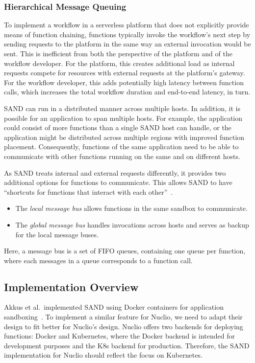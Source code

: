 \subsubsection{Hierarchical Message Queuing}

To implement a workflow in a serverless platform that does not explicitly provide means of function chaining, functions typically invoke the workflow's next step by sending requests to the platform in the same way an external invocation would be sent.
This is inefficient from both the perspective of the platform and of the workflow developer.
For the platform, this creates additional load as internal requests compete for resources with external requests at the platform's gateway.
For the workflow developer, this adds potentially high latency between function calls, which increases the total workflow duration and end-to-end latency, in turn.

SAND can run in a distributed manner across multiple hosts.
In addition, it is possible for an application to span multiple hosts.
For example, the application could consist of more functions than a single SAND host can handle, or the application might be distributed across multiple regions with improved function placement.
Consequently, functions of the same application need to be able to communicate with other functions running on the same and on different hosts.

As SAND treats internal and external requests differently, it provides two additional options for functions to communicate.
This allows SAND to have \enquote{shortcuts for functions that interact with each other}~\cite{akkus2018sand}.
\begin{itemize}
    \item The \emph{local message bus} allows functions in the same sandbox to communicate.
    \item The \emph{global message bus} handles invocations across hosts and serves as backup for the local message buses.
\end{itemize}
Here, a message bus is a set of FIFO queues, containing one queue per function, where each messages in a queue corresponds to a function call.

\subsection{Implementation Overview}

Akkus et al.~implemented SAND using Docker containers for application sandboxing~\cite{akkus2018sand}.
To implement a similar feature for Nuclio, we need to adapt their design to fit better for Nuclio's design.
Nuclio offers two backends for deploying functions: Docker and Kubernetes, where the Docker backend is intended for development purposes and the K8s backend for production. 
Therefore, the SAND implementation for Nuclio should reflect the focus on Kubernetes.

